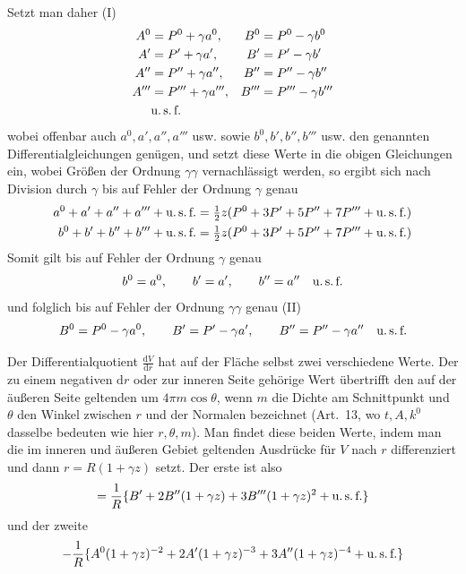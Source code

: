Setzt man daher (I)
\[
\begin{aligned}
A^0&=P^0+\gamma a^0,& B^0&=P^0-\gamma b^0\\
A'&=P'+\gamma a',& B'&=P'-\gamma b'\\
A''&=P''+\gamma a'',& B''&=P''-\gamma b''\\
A'''&=P'''+\gamma a''',& B'''&=P'''-\gamma b'''\\
&\text{u.\,s.\,f.}
\end{aligned}
\]
wobei offenbar auch $a^0,a',a'',a'''$ usw. sowie $b^0,b',b'',b'''$ usw. den genannten Differentialgleichungen genügen, und setzt diese Werte in die obigen Gleichungen ein, wobei Größen der Ordnung $\gamma\gamma$ vernachlässigt werden, so ergibt sich nach Division durch $\gamma$ bis auf Fehler der Ordnung $\gamma$ genau
\[
\begin{aligned}
a^0+a'+a''+a'''+\text{u.\,s.\,f.}&=\tfrac12 z(P^0+3P'+5P''+7P'''+\text{u.\,s.\,f.})\\
b^0+b'+b''+b'''+\text{u.\,s.\,f.}&=\tfrac12 z(P^0+3P'+5P''+7P'''+\text{u.\,s.\,f.})
\end{aligned}
\]
Somit gilt bis auf Fehler der Ordnung $\gamma$ genau
\[
b^0=a^0,\qquad b'=a',\qquad b''=a''\quad\text{u.\,s.\,f.}
\]
und folglich bis auf Fehler der Ordnung $\gamma\gamma$ genau (II)
\[
B^0=P^0-\gamma a^0,\qquad B'=P'-\gamma a',\qquad B''=P''-\gamma a''\quad\text{u.\,s.\,f.}
\]

Der Differentialquotient $\frac{\mathrm dV}{\mathrm dr}$ hat auf der Fläche selbst zwei verschiedene Werte. Der zu einem negativen $\mathrm dr$ oder zur inneren Seite gehörige Wert übertrifft den auf der äußeren Seite geltenden um $4\pi m\cos\theta$, wenn $m$ die Dichte am Schnittpunkt und $\theta$ den Winkel zwischen $r$ und der Normalen bezeichnet (Art.\ 13, wo $t,A,k^0$ dasselbe bedeuten wie hier $r,\theta,m$). Man findet diese beiden Werte, indem man die im inneren und äußeren Gebiet geltenden Ausdrücke für $V$ nach $r$ differenziert und dann $r=R(1+\gamma z)$ setzt. Der erste ist also
\[
=\frac1R\{B'+2B''(1+\gamma z)+3B'''(1+\gamma z)^2+\text{u.\,s.\,f.}\}
\]
und der zweite
\[
-\frac1R\{A^0(1+\gamma z)^{-2}+2A'(1+\gamma z)^{-3}+3A''(1+\gamma z)^{-4}+\text{u.\,s.\,f.}\}
\]


